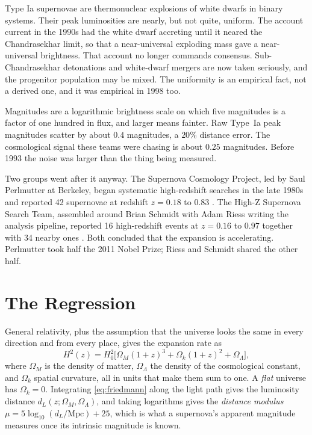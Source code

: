 \documentclass[11pt]{article}
\begin{document}
Type Ia supernovae are thermonuclear explosions of white dwarfs in binary
systems.  Their peak luminosities are nearly, but not quite, uniform.  The
account current in the 1990s had the white dwarf accreting until it neared the
Chandrasekhar limit, so that a near-universal exploding mass gave a
near-universal brightness.  That account no longer commands consensus.
Sub-Chandrasekhar detonations and white-dwarf mergers are now taken seriously,
and the progenitor population may be mixed.  The uniformity is an empirical
fact, not a derived one, and it was empirical in 1998 too.

Magnitudes are a logarithmic brightness scale on which five magnitudes is a
factor of one hundred in flux, and larger means fainter.  Raw Type~Ia peak
magnitudes scatter by about $0.4$ magnitudes, a $20\%$ distance error.  The
cosmological signal these teams were chasing is about $0.25$ magnitudes.
Before 1993 the noise was larger than the thing being measured.

Two groups went after it anyway.  The Supernova Cosmology Project, led by Saul
Perlmutter at Berkeley, began systematic high-redshift searches in the late
1980s and reported 42 supernovae at redshift $z = 0.18$ to $0.83$
\citep{Perlmutter1999}.  The High-Z Supernova Search Team, assembled around
Brian Schmidt with Adam Riess writing the analysis pipeline, reported 16
high-redshift events at $z = 0.16$ to $0.97$ together with 34 nearby ones
\citep{Riess1998}.  Both concluded that the expansion is accelerating.
Perlmutter took half the 2011 Nobel Prize; Riess and Schmidt shared the other
half.

\section{The Regression}

General relativity, plus the assumption that the universe looks the same in
every direction and from every place, gives the expansion rate as
\begin{equation}\label{eq:friedmann}
  H^2(z) = H_0^2\bigl[\Omega_M(1+z)^3 + \Omega_k(1+z)^2 + \Omega_\Lambda\bigr],
\end{equation}
where $\Omega_M$ is the density of matter, $\Omega_\Lambda$ the density of the
cosmological constant, and $\Omega_k$ spatial curvature, all in units that
make them sum to one.  A \emph{flat} universe has $\Omega_k = 0$.  Integrating
\eqref{eq:friedmann} along the light path gives the luminosity distance
$d_L(z; \Omega_M, \Omega_\Lambda)$, and taking logarithms gives the
\emph{distance modulus} $\mu = 5\log_{10}(d_L/\text{Mpc}) + 25$, which is what
a supernova's apparent magnitude measures once its intrinsic magnitude is
known.
\end{document}
